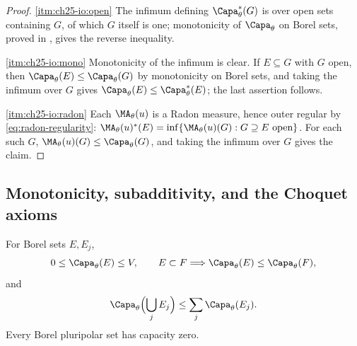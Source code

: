 \begin{proof}
\cref{itm:ch25-io:open}  The infimum defining $\Capa_\theta^*(G)$ is over
open sets containing $G$, of which $G$ itself is one; monotonicity of
$\Capa_\theta$ on Borel sets, proved in
, gives the reverse inequality.

\cref{itm:ch25-io:mono}  Monotonicity of the infimum is clear.  If
$E\subseteq G$ with $G$ open, then
$\Capa_\theta(E)\leq\Capa_\theta(G)$ by monotonicity on Borel sets, and
taking the infimum over $G$ gives
$\Capa_\theta(E)\leq\Capa_\theta^*(E)$; the last assertion follows.

\cref{itm:ch25-io:radon}  Each $\MA_\theta(u)$ is a Radon measure, hence
outer regular by \eqref{eq:radon-regularity}: $\MA_\theta(u)^*(E)
=\inf\{\MA_\theta(u)(G):G\supseteq E\ \text{open}\}$.  For each such $G$,
$\MA_\theta(u)(G)\leq\Capa_\theta(G)$, and taking the infimum over $G$
gives the claim.
\end{proof}

\subsection{Monotonicity, subadditivity, and the Choquet axioms}
\label{sec:ch25-elementary}

\begin{proposition}
\label{prop:capacity-elementary}
For Borel sets $E,E_j$,
\[
 0\leq\Capa_\theta(E)\leq V,\qquad
 E\subset F\Longrightarrow\Capa_\theta(E)\leq\Capa_\theta(F),
\]
and
\begin{equation}
\label{eq:capacity-subadditivity}
                  \Capa_\theta\Bigl(\bigcup_jE_j\Bigr)
                  \leq\sum_j\Capa_\theta(E_j).
\end{equation}
Every Borel pluripolar set has capacity zero.
\end{proposition}

